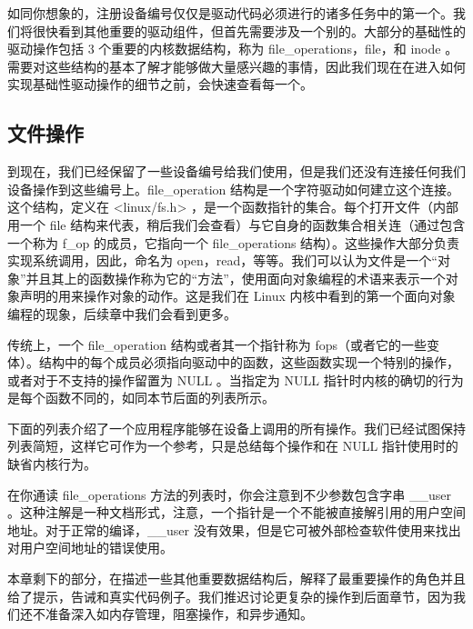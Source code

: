 \documentclass[lang=cn,newtx,10pt,scheme=chinese]{elegantbook}
\begin{document}
如同你想象的，注册设备编号仅仅是驱动代码必须进行的诸多任务中的第一个。我们将很快看到其他重要的驱动组件，但首先需要涉及一个别的。大部分的基础性的驱动操作包括 3 个重要的内核数据结构，称为 file\_operations，file，和 inode 。需要对这些结构的基本了解才能够做大量感兴趣的事情，因此我们现在在进入如何实现基础性驱动操作的细节之前，会快速查看每一个。

\subsection{文件操作}

到现在，我们已经保留了一些设备编号给我们使用，但是我们还没有连接任何我们设备操作到这些编号上。file\_operation 结构是一个字符驱动如何建立这个连接。这个结构，定义在 <linux/fs.h> ，是一个函数指针的集合。每个打开文件（内部用一个 file 结构来代表，稍后我们会查看）与它自身的函数集合相关连（通过包含一个称为 f\_op 的成员，它指向一个 file\_operations 结构）。这些操作大部分负责实现系统调用，因此，命名为 open，read，等等。我们可以认为文件是一个``对象''并且其上的函数操作称为它的``方法''，使用面向对象编程的术语来表示一个对象声明的用来操作对象的动作。这是我们在 Linux 内核中看到的第一个面向对象编程的现象，后续章中我们会看到更多。

传统上，一个 file\_operation 结构或者其一个指针称为 fops（或者它的一些变体）。结构中的每个成员必须指向驱动中的函数，这些函数实现一个特别的操作，或者对于不支持的操作留置为 NULL 。当指定为 NULL 指针时内核的确切的行为是每个函数不同的，如同本节后面的列表所示。

下面的列表介绍了一个应用程序能够在设备上调用的所有操作。我们已经试图保持列表简短，这样它可作为一个参考，只是总结每个操作和在 NULL 指针使用时的缺省内核行为。

在你通读 file\_operations 方法的列表时，你会注意到不少参数包含字串 \_\_user 。这种注解是一种文档形式，注意，一个指针是一个不能被直接解引用的用户空间地址。对于正常的编译，\_\_user 没有效果，但是它可被外部检查软件使用来找出对用户空间地址的错误使用。

本章剩下的部分，在描述一些其他重要数据结构后，解释了最重要操作的角色并且给了提示，告诫和真实代码例子。我们推迟讨论更复杂的操作到后面章节，因为我们还不准备深入如内存管理，阻塞操作，和异步通知。
\end{document}
